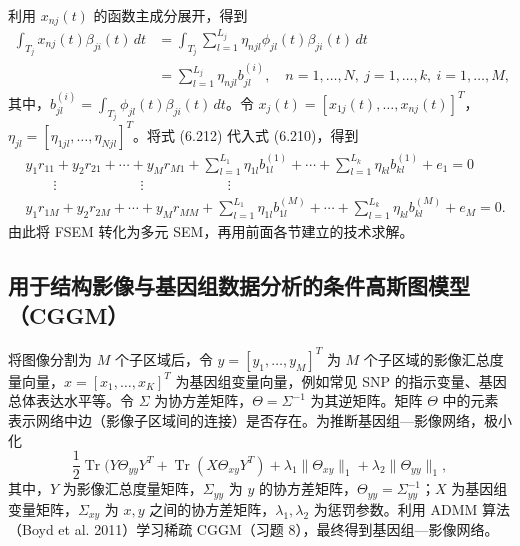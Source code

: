 利用 $x_{nj}(t)$ 的函数主成分展开，得到
\begin{equation}
\begin{aligned}
\int_{T_j}x_{nj}(t)\beta_{ji}(t)\,dt&=\int_{T_j}\sum_{l=1}^{L_j}\eta_{njl}\phi_{jl}(t)\beta_{ji}(t)\,dt\\
&=\sum_{l=1}^{L_j}\eta_{njl}b_{jl}^{(i)},\quad n=1,\ldots,N,\ j=1,\ldots,k,\ i=1,\ldots,M,
\end{aligned}\tag{6.212}
\end{equation}
其中，$b_{jl}^{(i)}=\int_{T_j}\phi_{jl}(t)\beta_{ji}(t)\,dt$。令 $x_j(t)=[x_{1j}(t),\ldots,x_{nj}(t)]^T$，$\eta_{jl}=[\eta_{1jl},\ldots,\eta_{Njl}]^T$。将式 (6.212) 代入式 (6.210)，得到
\begin{equation}
\begin{aligned}
&y_1r_{11}+y_2r_{21}+\cdots+y_Mr_{M1}+\sum_{l=1}^{L_1}\eta_{1l}b_{1l}^{(1)}+\cdots+\sum_{l=1}^{L_k}\eta_{kl}b_{kl}^{(1)}+e_1=0\\
&\qquad\vdots\qquad\qquad\qquad\vdots\qquad\qquad\qquad\vdots\\
&y_1r_{1M}+y_2r_{2M}+\cdots+y_Mr_{MM}+\sum_{l=1}^{L_1}\eta_{1l}b_{1l}^{(M)}+\cdots+\sum_{l=1}^{L_k}\eta_{kl}b_{kl}^{(M)}+e_M=0.
\end{aligned}\tag{6.213}
\end{equation}
由此将 FSEM 转化为多元 SEM，再用前面各节建立的技术求解。

\subsection{用于结构影像与基因组数据分析的条件高斯图模型（CGGM）}

将图像分割为 $M$ 个子区域后，令 $y=[y_1,\ldots,y_M]^T$ 为 $M$ 个子区域的影像汇总度量向量，$x=[x_1,\ldots,x_K]^T$ 为基因组变量向量，例如常见 SNP 的指示变量、基因总体表达水平等。令 $\Sigma$ 为协方差矩阵，$\Theta=\Sigma^{-1}$ 为其逆矩阵。矩阵 $\Theta$ 中的元素表示网络中边（影像子区域间的连接）是否存在。为推断基因组—影像网络，极小化
\begin{equation}
\frac12\operatorname{Tr}\bigl(Y\Theta_{yy}Y^T+\operatorname{Tr}(X\Theta_{xy}Y^T)+\lambda_1\lVert\Theta_{xy}\rVert_1+\lambda_2\lVert\Theta_{yy}\rVert_1,
\tag{6.214}
\end{equation}
其中，$Y$ 为影像汇总度量矩阵，$\Sigma_{yy}$ 为 $y$ 的协方差矩阵，$\Theta_{yy}=\Sigma_{yy}^{-1}$；$X$ 为基因组变量矩阵，$\Sigma_{xy}$ 为 $x,y$ 之间的协方差矩阵，$\lambda_1,\lambda_2$ 为惩罚参数。利用 ADMM 算法（Boyd et al. 2011）学习稀疏 CGGM（习题 8），最终得到基因组—影像网络。
